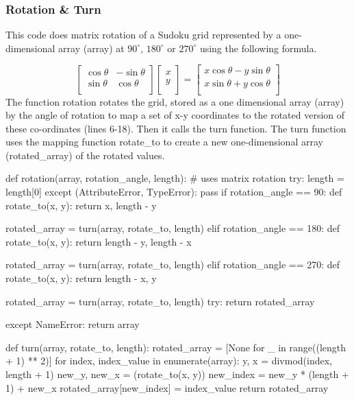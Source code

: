 \documentclass[fleqn]{article}
\begin{document}
\subsubsection{Rotation \& Turn}
 
This code does matrix rotation of a Sudoku grid represented by a one-dimensional array (array) at $90^\circ$, $180^\circ$ or $270^\circ$ using the following formula.

\[
\begin{bmatrix}
\cos{\theta} & -\sin{\theta}\\
\sin{\theta} & \cos{\theta}\\
\end{bmatrix}
\begin{bmatrix}
x\\ 
y\\
\end{bmatrix}
=
\begin{bmatrix}
x\cos{\theta} -y\sin{\theta}\\
x\sin{\theta} + y\cos{\theta}\\
\end{bmatrix}
\]
\newline
The function rotation rotates the grid, stored as a one dimensional array (array) by the angle of rotation to map a set of x-y coordinates to the rotated version of these co-ordinates (lines 6-18). Then it calls the turn function. The turn function uses the mapping function rotate\_to to create a new one-dimensional array (rotated\_array) of the rotated values.


\begin{python}
def rotation(array, rotation_angle, length):  # uses matrix rotation
    try:
        length = length[0]
    except (AttributeError, TypeError):
        pass
    if rotation_angle == 90:
        def rotate_to(x, y):
            return x, length - y

        rotated_array = turn(array, rotate_to, length)
    elif rotation_angle == 180:
        def rotate_to(x, y):
            return length - y, length - x

        rotated_array = turn(array, rotate_to, length)
    elif rotation_angle == 270:
        def rotate_to(x, y):
            return length - x, y

        rotated_array = turn(array, rotate_to, length)
    try:
        return rotated_array

    except NameError:
        return array


def turn(array, rotate_to, length):
    rotated_array = [None for _ in range((length + 1) ** 2)]
    for index, index_value in enumerate(array):
        y, x = divmod(index, length + 1)
        new_y, new_x = (rotate_to(x, y))
        new_index = new_y * (length + 1) + new_x
        rotated_array[new_index] = index_value
    return rotated_array
\end{python}
\end{document}
